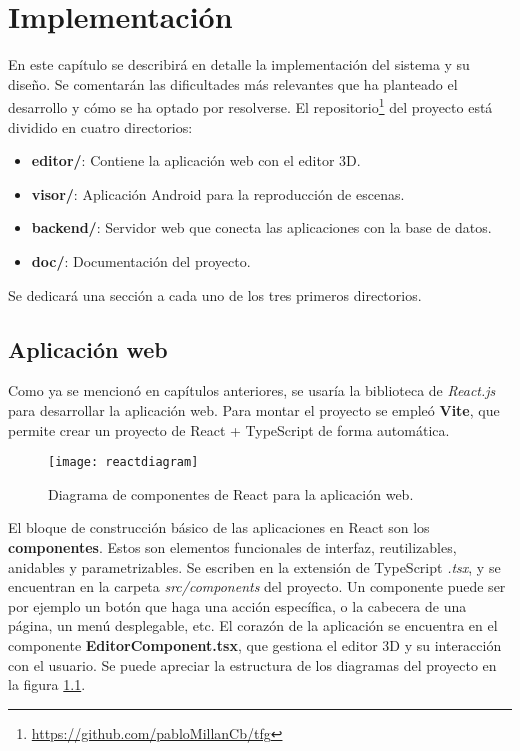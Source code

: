 \chapter{Implementación}

En este capítulo se describirá en detalle la implementación del sistema y su diseño. Se comentarán las dificultades más relevantes que ha planteado el desarrollo y cómo se ha optado por resolverse. El repositorio\footnote{\url{https://github.com/pabloMillanCb/tfg}} del proyecto está dividido en cuatro directorios:

\begin{itemize}
    \item \textbf{editor/}: Contiene la aplicación web con el editor 3D.
    \item \textbf{visor/}: Aplicación Android para la reproducción de escenas.
    \item \textbf{backend/}: Servidor web que conecta las aplicaciones con la base de datos.
    \item \textbf{doc/}: Documentación del proyecto.
\end{itemize}

Se dedicará una sección a cada uno de los tres primeros directorios.


\section{Aplicación web}

Como ya se mencionó en capítulos anteriores, se usaría la biblioteca de \textit{React.js}\cite{react} para desarrollar la aplicación web. Para montar el proyecto se empleó \textbf{Vite}\cite{vite}, que permite crear un proyecto de React + TypeScript de forma automática.

\begin{figure}[h]
    \centering
    \texttt{[image: reactdiagram]}
    \caption[Diagrama de componentes React de aplicación web]{Diagrama de componentes de React para la aplicación web.}
    \label{fig:reactdiagram}
\end{figure}

El bloque de construcción básico de las aplicaciones en React son los \textbf{componentes}. Estos son elementos funcionales de interfaz, reutilizables, anidables y parametrizables. Se escriben en la extensión de TypeScript \textit{.tsx}, y se encuentran en la carpeta \textit{src/components} del proyecto. Un componente puede ser por ejemplo un botón que haga una acción específica, o la cabecera de una página, un menú desplegable, etc. El corazón de la aplicación se encuentra en el componente \textbf{EditorComponent.tsx}, que gestiona el editor 3D y su interacción con el usuario. Se puede apreciar la estructura de los diagramas del proyecto en la figura \ref{fig:reactdiagram}.

